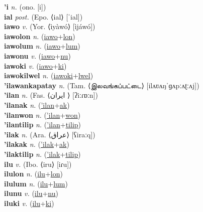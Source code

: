 \textbf{'i} \textit{n.} (ono. [i])
 \label{'i} \\
\textbf{ial} \textit{post.} (Epo. ⟨ial⟩ [ˈial])
 \label{ial} \\
\textbf{iawo} \textit{v.} (Yor. ⟨ìyàwó⟩ [ìjáwó])
 \label{iawo} \\
\textbf{iawolon} \textit{n.} (\hyperref[iawo]{iawo}+\hyperref[lon]{lon})
 \label{iawolon} \\
\textbf{iawolum} \textit{n.} (\hyperref[iawo]{iawo}+\hyperref[lum]{lum})
 \label{iawolum} \\
\textbf{iawonu} \textit{v.} (\hyperref[iawo]{iawo}+\hyperref[nu]{nu})
 \label{iawonu} \\
\textbf{iawoki} \textit{v.} (\hyperref[iawo]{iawo}+\hyperref[ki]{ki})
 \label{iawoki} \\
\textbf{iawokilwel} \textit{n.} (\hyperref[iawoki]{iawoki}+\hyperref[lwel]{lwel})
 \label{iawokilwel} \\
\textbf{'ilawankapatay} \textit{n.} (Tam. ⟨இலவங்கப்பட்டை⟩ [ilʌʋʌŋˈɡʌpːʌʈːʌj])
 \label{'ilawankapatay} \\
\textbf{'ilan} \textit{n.} (Fas. ⟨ایران‎ ⟩ [ʔiːɾɒːn])
 \label{'ilan} \\
\textbf{'ilanak} \textit{n.} (\hyperref['ilan]{'ilan}+\hyperref[ak]{ak})
 \label{'ilanak} \\
\textbf{'ilanwon} \textit{n.} (\hyperref['ilan]{'ilan}+\hyperref[won]{won})
 \label{'ilanwon} \\
\textbf{'ilantilip} \textit{n.} (\hyperref['ilan]{'ilan}+\hyperref[tilip]{tilip})
 \label{'ilantilip} \\
\textbf{'ilak} \textit{n.} (Ara. ⟨عراق⟩ [ʕiraːq])
 \label{'ilak} \\
\textbf{'ilakak} \textit{n.} (\hyperref['ilak]{'ilak}+\hyperref[ak]{ak})
 \label{'ilakak} \\
\textbf{'ilaktilip} \textit{n.} (\hyperref['ilak]{'ilak}+\hyperref[tilip]{tilip})
 \label{'ilaktilip} \\
\textbf{ilu} \textit{v.} (Ibo. ⟨iru⟩ [iɾu])
 \label{ilu} \\
\textbf{ilulon} \textit{n.} (\hyperref[ilu]{ilu}+\hyperref[lon]{lon})
 \label{ilulon} \\
\textbf{ilulum} \textit{n.} (\hyperref[ilu]{ilu}+\hyperref[lum]{lum})
 \label{ilulum} \\
\textbf{ilunu} \textit{v.} (\hyperref[ilu]{ilu}+\hyperref[nu]{nu})
 \label{ilunu} \\
\textbf{iluki} \textit{v.} (\hyperref[ilu]{ilu}+\hyperref[ki]{ki})
 \label{iluki} \\
